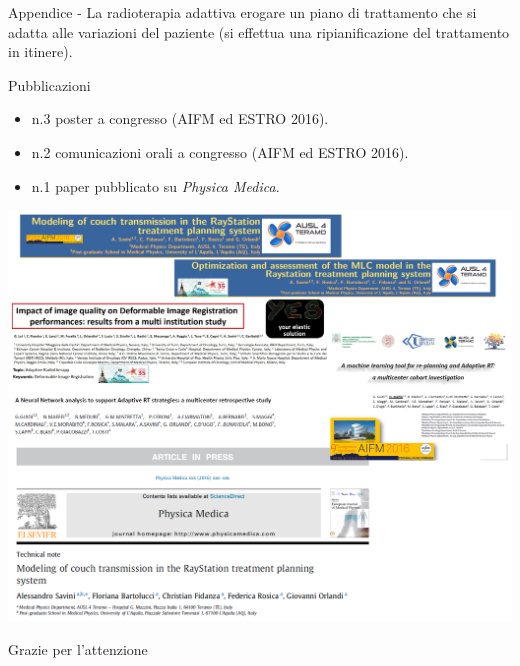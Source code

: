 \documentclass{beamer}
\begin{document}
\begin{frame}{Appendice - La radioterapia adattiva}
 erogare un piano di trattamento che si adatta alle variazioni del paziente (si effettua una ripianificazione del trattamento in itinere).
\end{frame}





\begin{frame}{Pubblicazioni}
\begin{itemize}
\tiny
\item n.3 poster a congresso (AIFM ed ESTRO 2016).
\item n.2 comunicazioni orali a congresso (AIFM ed ESTRO 2016).
\item n.1 paper pubblicato su \textit{Physica Medica}.
\end{itemize}
\begin{center}
\includegraphics[width=.9\textwidth]{./img/Pub.png}
\end{center}
\end{frame}

\begin{frame}
\centering
\Huge Grazie per l'attenzione
\end{frame}




\end{document}
